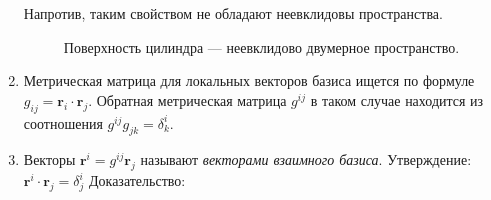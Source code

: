 \begin{enumerate}
    \begin{example} \label{cilinder_surface}
      Напротив, таким свойством не обладают неевклидовы пространства.
    	\begin{figure}[H]
    		\centering
    		
    		\caption{Поверхность цилиндра --- неевклидово двумерное пространство.}
    	\end{figure}
    \end{example}
    

  \item Метрическая матрица для локальных векторов базиса ищется по формуле $g_{ij} = \mathbf{r}_i \cdot \mathbf{r}_j$. 
    Обратная метрическая матрица $ g^{ij} $ в таком случае находится из соотношения $g^{ij} g_{jk} = \delta^i_k$.

  \item Векторы $\mathbf{r}^i = g^{ij} \mathbf{r}_j$ называют \emph{векторами взаимного
    базиса}.
    Утверждение: $\mathbf{r}^i \cdot \mathbf{r}_j = \delta^i_j$
    Доказательство: 
\end{enumerate}

